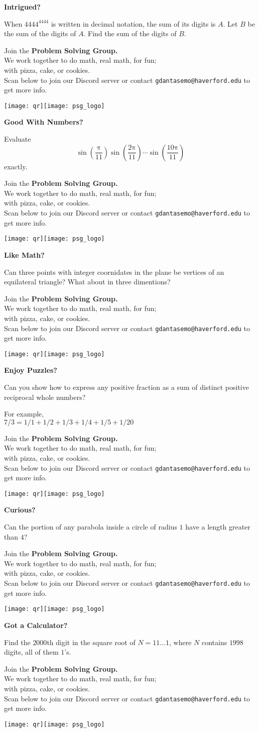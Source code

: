 \documentclass[20pt]{beamer}
\makeatletter
\newcommand\poster[2]{
\begin{frame}
	\begin{center}
		{\Huge \textbf{#1}}

		\vfill

		{\LARGE #2}

		\vfill

		Join the \textbf{Problem Solving Group.} \\ 
		We work together to do math, real math, for fun;\\
		with pizza, cake, or cookies. \\[1em]

		Scan below to join our Discord server or contact \texttt{gdantasemo@haverford.edu} to get more info.

		\vspace{.3in}

		\texttt{[image: qr]}\hspace{1in}\texttt{[image: psg\_logo]}
	\end{center}
\end{frame}
}
\makeatother
\begin{document}
\color{white}
	\poster{Intrigued?}{When \(4444^{4444}\) is written in decimal notation, the sum of its digits is \(A\).  Let \(B\) be the sum of the digits of \(A\). Find the sum of the digits of \(B\).}
	\poster{Good With Numbers?}{Evaluate \[
			\mathrm{\sin\left(\frac{\pi}{11}\right)
			\sin\left(\frac{2\pi}{11}\right)
			\cdots
		\sin\left(\frac{10\pi}{11}\right)}
	\]exactly.}
	\poster{Like Math?}{Can three points with integer coornidates in the plane be vertices of an equilateral triangle? What about in three dimentions?}
	\poster{Enjoy Puzzles?}{Can you show how to express any positive fraction as a sum of distinct positive reciprocal whole numbers?

		\vspace{.3in}

	{\normalsize For example, \\ $7/3 = 1/1 + 1/2 + 1/3 + 1/4 + 1/5 + 1/20$}}
	\poster{Curious?}{Can the portion of any parabola inside a circle of radius \(1\) have a length greater than \(4\)?}
	\poster{Got a Calculator?}{Find the $2000$th digit in the square root of $N = 11\dots1$, where $N$ contains $1998$ digits, all of them $1$’s.}
\end{document}
